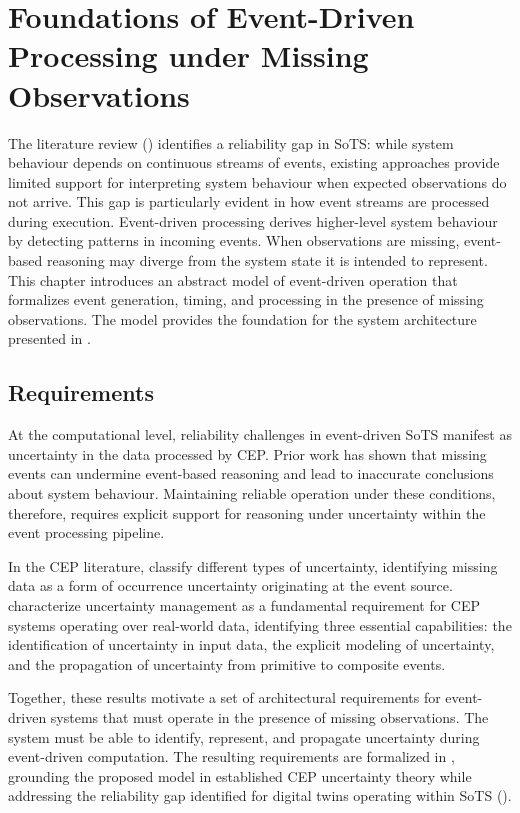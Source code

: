 \chapter{Foundations of Event-Driven Processing under Missing Observations}\label{ch:model}

The literature review () identifies a reliability gap in SoTS: while system behaviour depends on continuous streams of events, existing approaches provide limited support for interpreting system behaviour when expected observations do not arrive. This gap is particularly evident in how event streams are processed during execution. Event-driven processing derives higher-level system behaviour by detecting patterns in incoming events. When observations are missing, event-based reasoning may diverge from the system state it is intended to represent. This chapter introduces an abstract model of event-driven operation that formalizes event generation, timing, and processing in the presence of missing observations. The model provides the foundation for the system architecture presented in .


\section{Requirements}
\label{sec:requirements}

At the computational level, reliability challenges in event-driven SoTS manifest as uncertainty in the data processed by CEP. Prior work has shown that missing events can undermine event-based reasoning and lead to inaccurate conclusions about system behaviour. Maintaining reliable operation under these conditions, therefore, requires explicit support for reasoning under uncertainty within the event processing pipeline.

In the CEP literature, \citet{wasserkrug2006taxonomy} classify different types of uncertainty, identifying missing data as a form of occurrence uncertainty originating at the event source. \citet{cugola2015complex} characterize uncertainty management as a fundamental requirement for CEP systems operating over real-world data, identifying three essential capabilities: the identification of uncertainty in input data, the explicit modeling of uncertainty, and the propagation of uncertainty from primitive to composite events.

Together, these results motivate a set of architectural requirements for event-driven systems that must operate in the presence of missing observations. The system must be able to identify, represent, and propagate uncertainty during event-driven computation. The resulting requirements are formalized in , grounding the proposed model in established CEP uncertainty theory while addressing the reliability gap identified for digital twins operating within SoTS ().



